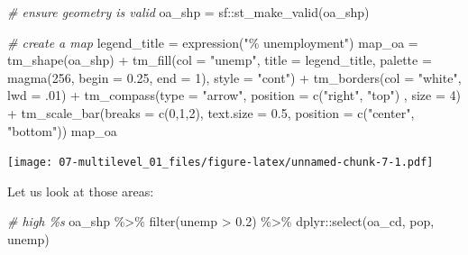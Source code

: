 \documentclass[
]{book}
\newenvironment{Shaded}{\begin{snugshade}}{\end{snugshade}}
\newcommand{\AttributeTok}[1]{\textcolor[rgb]{0.77,0.63,0.00}{#1}}
\newcommand{\CommentTok}[1]{\textcolor[rgb]{0.56,0.35,0.01}{\textit{#1}}}
\newcommand{\DecValTok}[1]{\textcolor[rgb]{0.00,0.00,0.81}{#1}}
\newcommand{\FloatTok}[1]{\textcolor[rgb]{0.00,0.00,0.81}{#1}}
\newcommand{\FunctionTok}[1]{\textcolor[rgb]{0.00,0.00,0.00}{#1}}
\newcommand{\NormalTok}[1]{#1}
\newcommand{\OtherTok}[1]{\textcolor[rgb]{0.56,0.35,0.01}{#1}}
\newcommand{\SpecialCharTok}[1]{\textcolor[rgb]{0.00,0.00,0.00}{#1}}
\newcommand{\StringTok}[1]{\textcolor[rgb]{0.31,0.60,0.02}{#1}}
\begin{document}
\begin{Shaded}
\begin{Highlighting}[]
\CommentTok{\# ensure geometry is valid}
\NormalTok{oa\_shp }\OtherTok{=}\NormalTok{ sf}\SpecialCharTok{::}\FunctionTok{st\_make\_valid}\NormalTok{(oa\_shp)}

\CommentTok{\# create a map}
\NormalTok{legend\_title }\OtherTok{=} \FunctionTok{expression}\NormalTok{(}\StringTok{"\% unemployment"}\NormalTok{)}
\NormalTok{map\_oa }\OtherTok{=} \FunctionTok{tm\_shape}\NormalTok{(oa\_shp) }\SpecialCharTok{+}
  \FunctionTok{tm\_fill}\NormalTok{(}\AttributeTok{col =} \StringTok{"unemp"}\NormalTok{, }\AttributeTok{title =}\NormalTok{ legend\_title, }\AttributeTok{palette =} \FunctionTok{magma}\NormalTok{(}\DecValTok{256}\NormalTok{, }\AttributeTok{begin =} \FloatTok{0.25}\NormalTok{, }\AttributeTok{end =} \DecValTok{1}\NormalTok{), }\AttributeTok{style =} \StringTok{"cont"}\NormalTok{) }\SpecialCharTok{+} 
  \FunctionTok{tm\_borders}\NormalTok{(}\AttributeTok{col =} \StringTok{"white"}\NormalTok{, }\AttributeTok{lwd =}\NormalTok{ .}\DecValTok{01}\NormalTok{)  }\SpecialCharTok{+} 
  \FunctionTok{tm\_compass}\NormalTok{(}\AttributeTok{type =} \StringTok{"arrow"}\NormalTok{, }\AttributeTok{position =} \FunctionTok{c}\NormalTok{(}\StringTok{"right"}\NormalTok{, }\StringTok{"top"}\NormalTok{) , }\AttributeTok{size =} \DecValTok{4}\NormalTok{) }\SpecialCharTok{+} 
  \FunctionTok{tm\_scale\_bar}\NormalTok{(}\AttributeTok{breaks =} \FunctionTok{c}\NormalTok{(}\DecValTok{0}\NormalTok{,}\DecValTok{1}\NormalTok{,}\DecValTok{2}\NormalTok{), }\AttributeTok{text.size =} \FloatTok{0.5}\NormalTok{, }\AttributeTok{position =}  \FunctionTok{c}\NormalTok{(}\StringTok{"center"}\NormalTok{, }\StringTok{"bottom"}\NormalTok{)) }
\NormalTok{map\_oa}
\end{Highlighting}
\end{Shaded}

\texttt{[image: 07-multilevel\_01\_files/figure-latex/unnamed-chunk-7-1.pdf]}

Let us look at those areas:

\begin{Shaded}
\begin{Highlighting}[]
\CommentTok{\# high \%s}
\NormalTok{oa\_shp }\SpecialCharTok{\%\textgreater{}\%} \FunctionTok{filter}\NormalTok{(unemp }\SpecialCharTok{\textgreater{}} \FloatTok{0.2}\NormalTok{) }\SpecialCharTok{\%\textgreater{}\%} 
\NormalTok{  dplyr}\SpecialCharTok{::}\FunctionTok{select}\NormalTok{(oa\_cd, pop, unemp) }
\end{Highlighting}
\end{Shaded}
\end{document}
